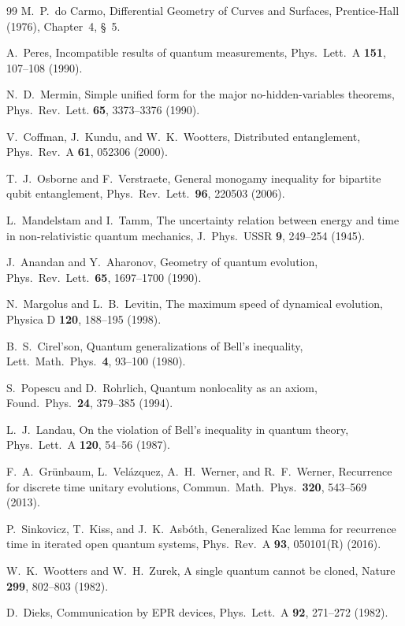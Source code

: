 \documentclass[aps,pra,onecolumn,superscriptaddress,nofootinbib,10pt]{revtex4-2}
\theoremstyle{definition}
\theoremstyle{remark}
\begin{document}
\begin{thebibliography}{99}
 M.~P.~do Carmo, Differential Geometry of Curves and Surfaces, Prentice-Hall (1976), Chapter~4, \S~5.

 A.~Peres, Incompatible results of quantum measurements, Phys.\ Lett.\ A \textbf{151}, 107--108 (1990).

 N.~D.~Mermin, Simple unified form for the major no-hidden-variables theorems, Phys.\ Rev.\ Lett. \textbf{65}, 3373--3376 (1990).

 V.~Coffman, J.~Kundu, and W.~K.~Wootters, Distributed entanglement, Phys.\ Rev.\ A \textbf{61}, 052306 (2000).

 T.~J.~Osborne and F.~Verstraete, General monogamy inequality for bipartite qubit entanglement, Phys.\ Rev.\ Lett.\ \textbf{96}, 220503 (2006).

 L.~Mandelstam and I.~Tamm, The uncertainty relation between energy and time in non-relativistic quantum mechanics, J.\ Phys.\ USSR \textbf{9}, 249--254 (1945).

 J.~Anandan and Y.~Aharonov, Geometry of quantum evolution, Phys.\ Rev.\ Lett.\ \textbf{65}, 1697--1700 (1990).

 N.~Margolus and L.~B.~Levitin, The maximum speed of dynamical evolution, Physica D \textbf{120}, 188--195 (1998).

 B.~S.~Cirel'son, Quantum generalizations of Bell's inequality, Lett.\ Math.\ Phys.\ \textbf{4}, 93--100 (1980).

 S.~Popescu and D.~Rohrlich, Quantum nonlocality as an axiom, Found.\ Phys.\ \textbf{24}, 379--385 (1994).

 L.~J.~Landau, On the violation of Bell's inequality in quantum theory, Phys.\ Lett.\ A \textbf{120}, 54--56 (1987).

 F.~A.~Gr\"unbaum, L.~Vel\'azquez, A.~H.~Werner, and R.~F.~Werner, Recurrence for discrete time unitary evolutions, Commun.\ Math.\ Phys.\ \textbf{320}, 543--569 (2013).

 P.~Sinkovicz, T.~Kiss, and J.~K.~Asb\'oth, Generalized Kac lemma for recurrence time in iterated open quantum systems, Phys.\ Rev.\ A \textbf{93}, 050101(R) (2016).

 W.~K.~Wootters and W.~H.~Zurek, A single quantum cannot be cloned, Nature \textbf{299}, 802--803 (1982).

 D.~Dieks, Communication by EPR devices, Phys.\ Lett.\ A \textbf{92}, 271--272 (1982).


\end{thebibliography}
\end{document}
